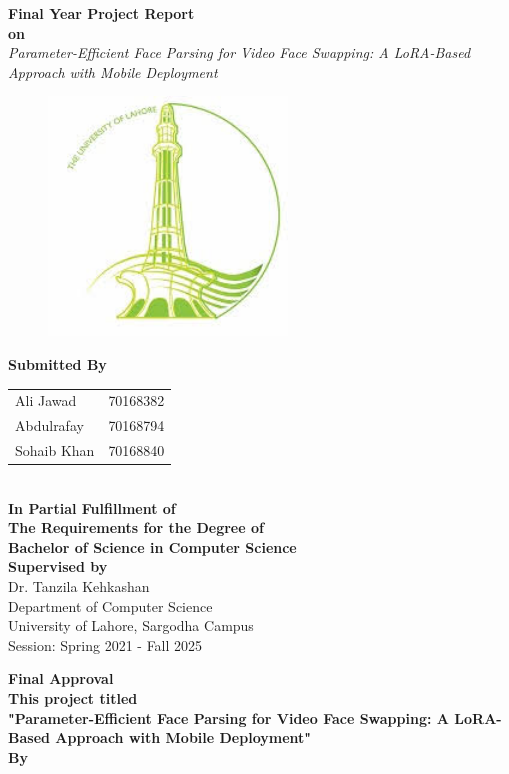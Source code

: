 \documentclass[12pt,a4paper]{report}
\begin{document}
\begin{titlepage}
\centering
\Large{\textbf{Final Year Project Report}}\\[0.3cm]
\Large{\textbf{on}}\\[0.3cm]
\Large{\textit{Parameter-Efficient Face Parsing for Video Face Swapping: A LoRA-Based Approach with Mobile Deployment}}\\[0.3cm]

\begin{figure}[!ht]
\centering
\includegraphics[width = 2.5in]{figures/logo.jpg}
\caption*{}
\end{figure}

\normalsize{\textbf{Submitted By}}\\[0.3cm]
\begin{tabular}{ll}
Ali Jawad & 70168382 \\
Abdulrafay & 70168794 \\
Sohaib Khan & 70168840 \\
\end{tabular}\\[0.8cm]

\normalsize{\textbf{In Partial Fulfillment of}}\\
\normalsize{\textbf{The Requirements for the Degree of}}\\
\normalsize{\textbf{Bachelor of Science in Computer Science}}\\[0.8cm]

\normalsize{\textbf{Supervised by}}\\
\normalsize{Dr. Tanzila Kehkashan}\\[0.8cm]

\normalsize{Department of Computer Science}\\
\normalsize{University of Lahore, Sargodha Campus}\\[0.3cm]
\normalsize{Session: Spring 2021 - Fall 2025}
\end{titlepage}
\newpage
\begin{center}
\textbf{Final Approval}\\[0.2cm]
\textbf{This project titled}\\[0.2cm]
\textbf{"Parameter-Efficient Face Parsing for Video Face Swapping: A LoRA-Based Approach with Mobile Deployment"}\\[0.3cm]
\textbf{By}\\[0.2cm]
\end{center}
\end{document}
